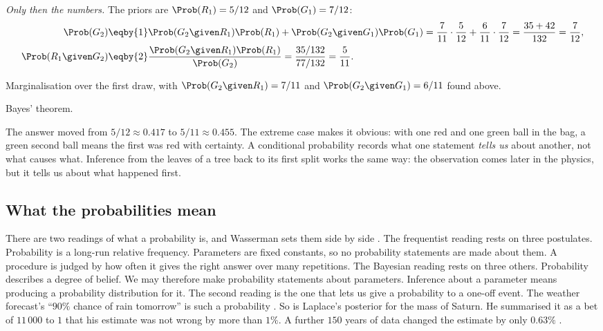 \emph{Only then the numbers.} The priors are $\Prob(R_1)=5/12$ and
$\Prob(G_1)=7/12$:
\begin{align*}
  \Prob(G_2)
  &\eqby{1}\Prob(G_2\given R_1)\Prob(R_1)+\Prob(G_2\given G_1)\Prob(G_1)
   =\frac{7}{11}\cdot\frac{5}{12}+\frac{6}{11}\cdot\frac{7}{12}
   =\frac{35+42}{132}=\frac{7}{12},\\
  \Prob(R_1\given G_2)
  &\eqby{2}\frac{\Prob(G_2\given R_1)\Prob(R_1)}{\Prob(G_2)}
   =\frac{35/132}{77/132}=\frac{5}{11} .
\end{align*}
\begin{explain}
  \item Marginalisation over the first draw, with $\Prob(G_2\given R_1)=7/11$ and
        $\Prob(G_2\given G_1)=6/11$ found above.
  \item Bayes' theorem.
\end{explain}
The answer moved from $5/12\approx0.417$ to $5/11\approx0.455$. The extreme case
makes it obvious: with one red and one green ball in the bag, a green second ball
means the first was red with certainty. A conditional probability records what
one statement \emph{tells us} about another, not what causes what. Inference from
the leaves of a tree back to its first split works the same way: the observation
comes later in the physics, but it tells us about what happened first.

\subsection{What the probabilities mean}

There are two readings of what a probability is, and Wasserman sets them side by
side . The frequentist reading rests on three postulates.
Probability is a long-run relative frequency. Parameters are fixed constants, so
no probability statements are made about them. A procedure is judged by how
often it gives the right answer over many repetitions. The Bayesian reading rests
on three others. Probability describes a degree of belief. We may therefore make
probability statements about parameters. Inference about a parameter means
producing a probability distribution for it. The second reading is the one that
lets us give a probability to a one-off event. The weather forecast's ``$90\%$
chance of rain tomorrow'' is such a probability . So is
Laplace's posterior for the mass of Saturn. He summarised it as a bet of
$11\,000$ to $1$ that his estimate was not wrong by more than $1\%$. A further
$150$ years of data changed the estimate by only $0.63\%$ .

